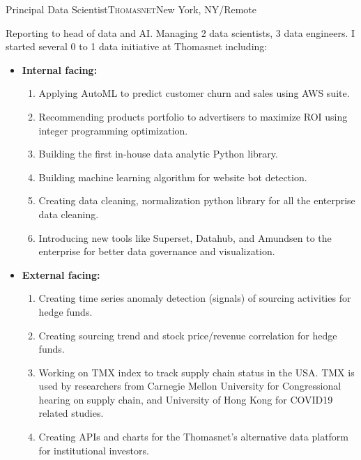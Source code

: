 \documentclass[12pt,a4paper,roman]{moderncv} %
\begin{document}
 {Principal Data Scientist}{\textsc{Thomasnet}}{New York, NY/Remote}{}{
Reporting to head of data and AI. Managing 2 data scientists, 3 data engineers.
I started several 0 to 1 data initiative at Thomasnet including:
\begin{itemize}
\item \textbf{Internal facing:}
    \begin{enumerate}
    \item Applying AutoML to predict customer churn and sales using AWS suite.
    \item Recommending products portfolio to advertisers to maximize ROI using integer programming optimization.
    \item Building the first in-house data analytic Python library.
    \item Building machine learning algorithm for website bot detection.
    \item  Creating data cleaning, normalization python library for all the enterprise data cleaning.
    \item Introducing new tools like Superset, Datahub, and Amundsen to the enterprise for better data governance and visualization.
    \end{enumerate}
\item \textbf{External facing:}
    \begin{enumerate}
    \item Creating time series anomaly detection (signals) of sourcing activities for hedge funds.
    \item Creating sourcing trend and stock price/revenue correlation for hedge funds.
    \item Working on TMX index to track supply chain status in the USA. TMX is used by researchers from Carnegie Mellon University for Congressional hearing on supply chain, and University of Hong Kong for COVID19 related studies.
    \item Creating APIs and charts for the Thomasnet's alternative data platform for institutional investors.
    \end{enumerate}
\end{itemize}
 }
\end{document}
